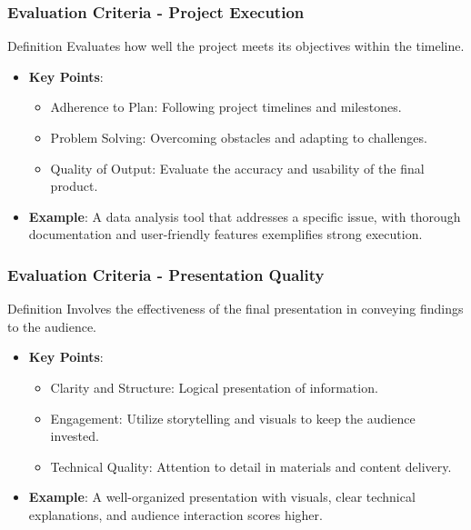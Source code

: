 \documentclass[aspectratio=169]{beamer}
\begin{document}
\begin{frame}[fragile]
    \frametitle{Evaluation Criteria - Project Execution}
    \begin{block}{Definition}
        Evaluates how well the project meets its objectives within the timeline.
    \end{block}
    
    \begin{itemize}
        \item \textbf{Key Points}:
        \begin{itemize}
            \item Adherence to Plan: Following project timelines and milestones.
            \item Problem Solving: Overcoming obstacles and adapting to challenges.
            \item Quality of Output: Evaluate the accuracy and usability of the final product.
        \end{itemize}

        \item \textbf{Example}: 
        A data analysis tool that addresses a specific issue, with thorough documentation and user-friendly features exemplifies strong execution.
    \end{itemize}
\end{frame}

\begin{frame}[fragile]
    \frametitle{Evaluation Criteria - Presentation Quality}
    \begin{block}{Definition}
        Involves the effectiveness of the final presentation in conveying findings to the audience.
    \end{block}
    
    \begin{itemize}
        \item \textbf{Key Points}:
        \begin{itemize}
            \item Clarity and Structure: Logical presentation of information.
            \item Engagement: Utilize storytelling and visuals to keep the audience invested.
            \item Technical Quality: Attention to detail in materials and content delivery.
        \end{itemize}

        \item \textbf{Example}: 
        A well-organized presentation with visuals, clear technical explanations, and audience interaction scores higher.
    \end{itemize}
\end{frame}
\end{document}
